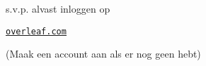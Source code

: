 \begin{frame}
	\titlepage
	\centering

	{\Large s.v.p. alvast inloggen op}

	\vspace{10pt}
	\href{https://www.overleaf.com}{\huge\ul{\texttt{overleaf.com}}}

	\vspace{10pt}
	{\small (Maak een account aan als er nog geen hebt)}
\end{frame}
